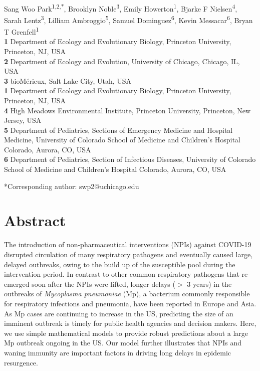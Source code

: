\documentclass[12pt]{article}
\date{\today}
\begin{document}
\begin{flushleft}{
	\Large
	\textbf{}
}
\newline
\\ 
Sang Woo Park\textsuperscript{1,2,*}, Brooklyn Noble\textsuperscript{3}, Emily Howerton\textsuperscript{1}, Bjarke F Nielsen\textsuperscript{4}, Sarah Lentz\textsuperscript{3}, Lilliam Ambroggio\textsuperscript{5}, Samuel Dominguez\textsuperscript{6}, Kevin Messacar\textsuperscript{6}, Bryan T Grenfell\textsuperscript{1}
\\
\bigskip
\textbf{1} Department of Ecology and Evolutionary Biology, Princeton University, Princeton, NJ, USA
\\
\textbf{2} Department of Ecology and Evolution, University of Chicago, Chicago, IL, USA
\\
\textbf{3} bioMérieux, Salt Lake City, Utah, USA
\\
\textbf{1} Department of Ecology and Evolutionary Biology, Princeton University, Princeton, NJ, USA
\\
\textbf{4} High Meadows Environmental Institute, Princeton University, Princeton, New Jersey, USA
\\
\textbf{5} Department of Pediatrics, Sections of Emergency Medicine and Hospital Medicine, University of Colorado School of Medicine and Children's Hospital Colorado, Aurora, CO, USA
\\
\textbf{6} Department of Pediatrics, Section of Infectious Diseases, University of Colorado School of Medicine and Children's Hospital Colorado, Aurora, CO, USA
\\
\bigskip

*Corresponding author: swp2@uchicago.edu
\bigskip
\end{flushleft} 

\section*{Abstract}
The introduction of non-pharmaceutical interventions (NPIs) against COVID-19 disrupted circulation of many respiratory pathogens and eventually caused large, delayed outbreaks, owing to the build up of the susceptible pool during the intervention period.
In contrast to other common respiratory pathogens that re-emerged soon after the NPIs were lifted, longer delays ($>$ 3 years) in the outbreaks of \textit{Mycoplasma pneumoniae} (Mp), a bacterium commonly responsible for respiratory infections and pneumonia, have been reported in Europe and Asia.
As Mp cases are continuing to increase in the US, predicting the size of an imminent outbreak is timely for public health agencies and decision makers.
Here, we use simple mathematical models to provide robust predictions about a large Mp outbreak ongoing in the US.
Our model further illustrates that NPIs and waning immunity are important factors in driving long delays in epidemic resurgence.
\end{document}
